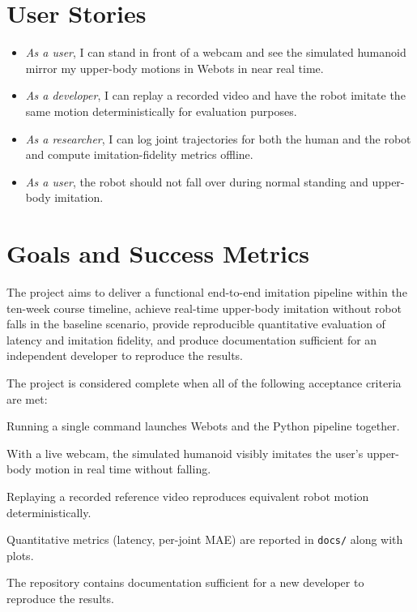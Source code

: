 \documentclass[conference]{IEEEtran}
\begin{document}
\section{User Stories}
\begin{itemize}
  \item \textit{As a user}, I can stand in front of a webcam and see the simulated humanoid mirror my upper-body motions in Webots in near real time.
  \item \textit{As a developer}, I can replay a recorded video and have the robot imitate the same motion deterministically for evaluation purposes.
  \item \textit{As a researcher}, I can log joint trajectories for both the human and the robot and compute imitation-fidelity metrics offline.
  \item \textit{As a user}, the robot should not fall over during normal standing and upper-body imitation.
\end{itemize}
 
\section{Goals and Success Metrics}
The project aims to deliver a functional end-to-end imitation pipeline within the ten-week
course timeline, achieve real-time upper-body imitation without robot falls in the baseline
scenario, provide reproducible quantitative evaluation of latency and imitation fidelity, and
produce documentation sufficient for an independent developer to reproduce the results.
 
The project is considered complete when all of the following acceptance criteria are met:
\begin{bracketlist}
  \item Running a single command launches Webots and the Python pipeline together.
  \item With a live webcam, the simulated humanoid visibly imitates the user's upper-body motion in real time without falling.
  \item Replaying a recorded reference video reproduces equivalent robot motion deterministically.
  \item Quantitative metrics (latency, per-joint MAE) are reported in \texttt{docs/} along with plots.
  \item The repository contains documentation sufficient for a new developer to reproduce the results.
\end{bracketlist}
 
\end{document}
